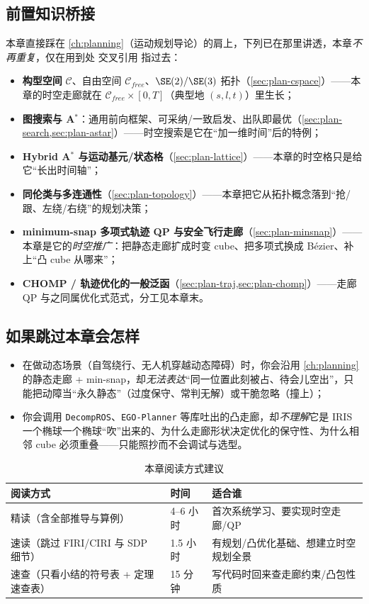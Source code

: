 \subsection*{前置知识桥接}
本章直接踩在 \cref{ch:planning}（运动规划导论）的肩上，下列已在那里讲透，本章\emph{不再重复}，仅在用到处 交叉引用 指过去：
\begin{itemize}
  \item \textbf{构型空间} $\mathcal{C}$、自由空间 $\mathcal{C}_{free}$、$\SE(2)/\SE(3)$ 拓扑（\cref{sec:plan-cspace}）——本章的时空走廊就在 $\mathcal{C}_{free}\times[0,T]$（典型地 $(s,l,t)$）里生长；
  \item \textbf{图搜索与 A$^*$}：通用前向框架、可采纳/一致启发、出队即最优（\cref{sec:plan-search,sec:plan-astar}）——时空搜索是它在“加一维时间”后的特例；
  \item \textbf{Hybrid A$^*$ 与运动基元/状态格}（\cref{sec:plan-lattice}）——本章的时空格只是给它“长出时间轴”；
  \item \textbf{同伦类与多连通性}（\cref{sec:plan-topology}）——本章把它从拓扑概念落到“抢/跟、左绕/右绕”的规划决策；
  \item \textbf{minimum-snap 多项式轨迹 QP 与安全飞行走廊}（\cref{sec:plan-minsnap}）——本章是它的\emph{时空推广}：把静态走廊扩成时变 cube、把多项式换成 Bézier、补上“凸 cube 从哪来”；
  \item \textbf{CHOMP / 轨迹优化的一般泛函}（\cref{sec:plan-traj,sec:plan-chomp}）——走廊 QP 与之同属优化式范式，分工见本章末。
\end{itemize}

\subsection*{如果跳过本章会怎样}
\begin{itemize}
  \item 在做动态场景（自驾绕行、无人机穿越动态障碍）时，你会沿用 \cref{ch:planning} 的静态走廊 + min-snap，却\emph{无法表达}“同一位置此刻被占、待会儿空出”，只能把动障当“永久静态”（过度保守、常判无解）或干脆忽略（撞上）；
  \item 你会调用 \verb#DecompROS#、\verb#EGO-Planner# 等库吐出的凸走廊，却\emph{不理解}它是 IRIS 一个椭球一个椭球“吹”出来的、为什么走廊形状决定优化的保守性、为什么相邻 cube 必须重叠——只能照抄而不会调试与选型。
\end{itemize}

\begin{table}[H]\centering\small
\caption{本章阅读方式建议}
\label{tab:stc-reading}
\begin{tabular}{lll}
\toprule
阅读方式 & 时间 & 适合谁 \\
\midrule
精读（含全部推导与算例） & 4--6 小时 & 首次系统学习、要实现时空走廊/QP \\
速读（跳过 FIRI/CIRI 与 SDP 细节） & 1.5 小时 & 有规划/凸优化基础、想建立时空规划全景 \\
速查（只看小结的符号表 + 定理速查表） & 15 分钟 & 写代码时回来查走廊约束/凸包性质 \\
\bottomrule
\end{tabular}
\end{table}

